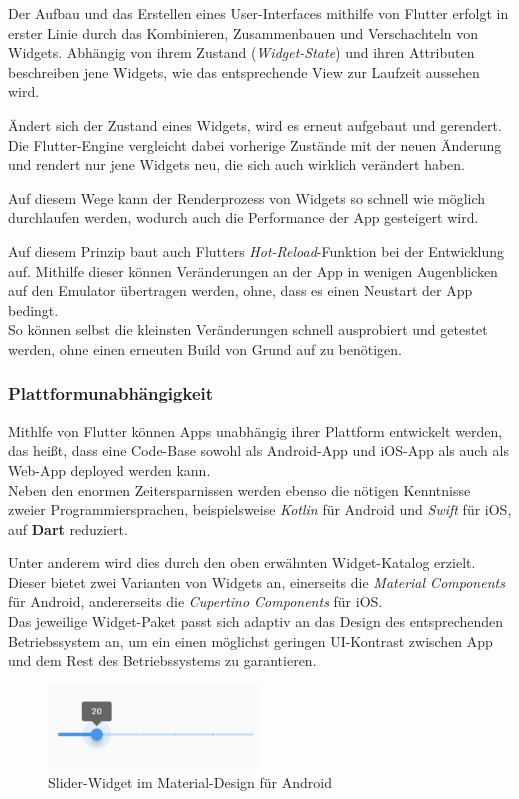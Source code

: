 Der Aufbau und das Erstellen eines User-Interfaces mithilfe von Flutter erfolgt in erster Linie
durch das Kombinieren, Zusammenbauen und Verschachteln von Widgets.
Abhängig von ihrem Zustand (\textit{Widget-State}) und ihren Attributen beschreiben jene Widgets, wie das entsprechende
View zur Laufzeit aussehen wird.

Ändert sich der Zustand eines Widgets, wird es erneut aufgebaut und gerendert. Die Flutter-Engine 
vergleicht dabei vorherige Zustände mit der neuen Änderung und rendert nur jene Widgets neu, die
sich auch wirklich verändert haben.

Auf diesem Wege kann der Renderprozess von Widgets so schnell wie möglich durchlaufen werden, wodurch
auch die Performance der App gesteigert wird.

Auf diesem Prinzip baut auch Flutters \textit{Hot-Reload}-Funktion bei der Entwicklung auf. Mithilfe dieser
können Veränderungen an der App in wenigen Augenblicken auf den Emulator übertragen werden, ohne, dass es einen
Neustart der App bedingt.\\
So können selbst die kleinsten Veränderungen schnell ausprobiert und getestet werden, ohne einen erneuten Build von Grund auf
zu benötigen.

\subsubsection{Plattformunabhängigkeit}

Mithlfe von Flutter können Apps unabhängig ihrer Plattform entwickelt werden, das heißt, dass eine Code-Base
sowohl als Android-App und iOS-App als auch als Web-App deployed werden kann.\\
Neben den enormen Zeitersparnissen werden ebenso die nötigen Kenntnisse zweier Programmiersprachen, beispielsweise
\textit{Kotlin} für Android und \textit{Swift} für iOS, auf \textbf{Dart} reduziert.

Unter anderem wird dies durch den oben erwähnten Widget-Katalog erzielt. Dieser bietet zwei Varianten
von Widgets an, einerseits die \textit{Material Components} für Android, andererseits die \textit{Cupertino Components}
für iOS.\\
Das jeweilige Widget-Paket passt sich adaptiv an das Design des entsprechenden Betriebssystem an, um ein einen möglichst
geringen UI-Kontrast zwischen App und dem Rest des Betriebssystems zu garantieren.

\begin{figure}[H]
    \begin{center}
        \includegraphics[width=0.5\textwidth]{images/Flutter/material-slider.png}
        \caption{Slider-Widget im Material-Design für Android}
    \end{center}
\end{figure}

